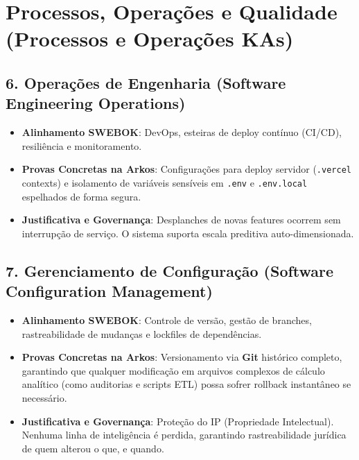 \section{Processos, Operações e Qualidade (Processos e Operações KAs)}

\subsection{6. Operações de Engenharia (Software Engineering Operations)}
\begin{itemize}
    \item \textbf{Alinhamento SWEBOK}: DevOps, esteiras de deploy contínuo (CI/CD), resiliência e monitoramento.
    \item \textbf{Provas Concretas na Arkos}: Configurações para deploy servidor (\texttt{.vercel} contexts) e isolamento de variáveis sensíveis em \texttt{.env} e \texttt{.env.local} espelhados de forma segura.
    \item \textbf{Justificativa e Governança}: Desplanches de novas features ocorrem sem interrupção de serviço. O sistema suporta escala preditiva auto-dimensionada.
\end{itemize}

\subsection{7. Gerenciamento de Configuração (Software Configuration Management)}
\begin{itemize}
    \item \textbf{Alinhamento SWEBOK}: Controle de versão, gestão de branches, rastreabilidade de mudanças e lockfiles de dependências.
    \item \textbf{Provas Concretas na Arkos}: Versionamento via \textbf{Git} histórico completo, garantindo que qualquer modificação em arquivos complexos de cálculo analítico (como auditorias e scripts ETL) possa sofrer rollback instantâneo se necessário.
    \item \textbf{Justificativa e Governança}: Proteção do IP (Propriedade Intelectual). Nenhuma linha de inteligência é perdida, garantindo rastreabilidade jurídica de quem alterou o que, e quando.
\end{itemize}

